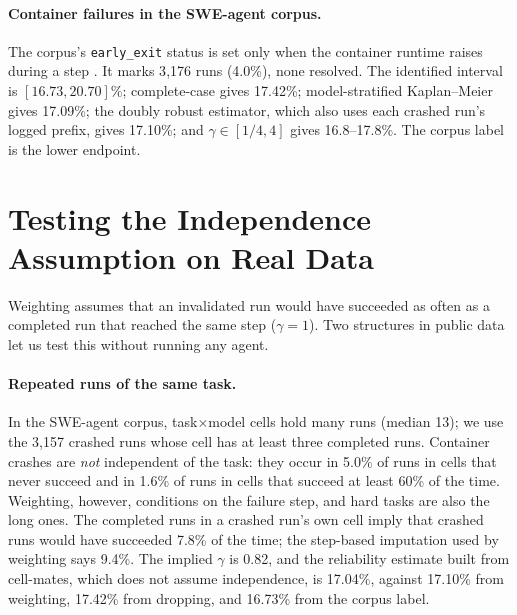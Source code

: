\documentclass[11pt]{article}
\theoremstyle{definition}
\theoremstyle{remark}
\begin{document}
\paragraph{Container failures in the SWE-agent corpus.} The corpus's
\texttt{early\_exit} status is set only when the container runtime raises during
a step \citep{sweagent2024code}. It marks 3{,}176 runs (4.0\%), none resolved.
The identified interval is $[16.73,20.70]\%$; complete-case gives 17.42\%;
model-stratified Kaplan--Meier gives 17.09\%; the doubly robust estimator, which
also uses each crashed run's logged prefix, gives 17.10\%; and $\gamma\in[1/4,4]$ gives 16.8--17.8\%. The corpus label is the lower
endpoint.

\section{Testing the Independence Assumption on Real Data}
\label{sec:tests}

Weighting assumes that an invalidated run would have succeeded as often as a
completed run that reached the same step ($\gamma=1$). Two structures in public
data let us test this without running any agent.

\paragraph{Repeated runs of the same task.} In the SWE-agent corpus,
task$\times$model cells hold many runs (median 13); we use the 3{,}157 crashed
runs whose cell has at least three completed runs. Container crashes are
\emph{not} independent of the task: they occur in 5.0\% of runs in cells that
never succeed and in 1.6\% of runs in cells that succeed at least 60\% of the
time. Weighting, however, conditions on the failure step, and hard tasks are
also the long ones. The completed runs in a crashed run's own cell imply that
crashed runs would have succeeded 7.8\% of the time; the step-based imputation
used by weighting says 9.4\%. The implied $\gamma$ is 0.82, and the reliability
estimate built from cell-mates, which does not assume independence, is 17.04\%,
against 17.10\% from weighting, 17.42\% from dropping, and 16.73\% from the
corpus label.
\end{document}
